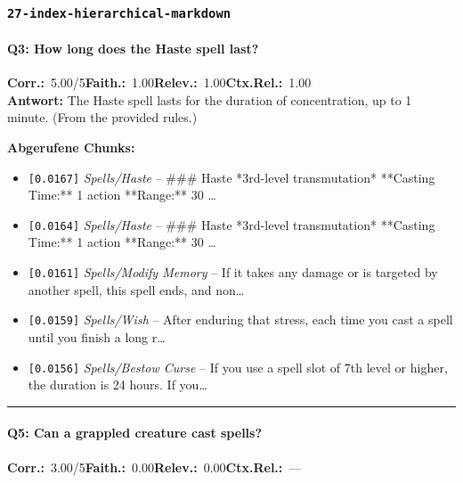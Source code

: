 \subsubsection*{\texttt{27-index-hierarchical-markdown}}
\label{app:samples:27_index_hierarchical_markdown}

\paragraph{Q3: How long does the Haste spell last?}
\noindent \textbf{Corr.:}~5.00/5\quad \textbf{Faith.:}~1.00\quad \textbf{Relev.:}~1.00\quad \textbf{Ctx.Rel.:}~1.00\\

\noindent\textbf{Antwort:} The Haste spell lasts for the duration of concentration, up to 1 minute. (From the provided rules.)

\noindent\textbf{Abgerufene Chunks:}
\begin{itemize}[noitemsep, topsep=2pt]
  \item[\textbf{\#1}] \texttt{[0.0167]} \textit{Spells/Haste} -- \#\#\# Haste  *3rd-level transmutation*  **Casting Time:** 1 action  **Range:** 30 \ldots
  \item[\textbf{\#2}] \texttt{[0.0164]} \textit{Spells/Haste} -- \#\#\# Haste  *3rd-level transmutation*  **Casting Time:** 1 action  **Range:** 30 \ldots
  \item[\textbf{\#3}] \texttt{[0.0161]} \textit{Spells/Modify Memory} -- If it takes any damage or is targeted by another spell, this spell ends, and non\ldots
  \item[\textbf{\#4}] \texttt{[0.0159]} \textit{Spells/Wish} -- After enduring that stress, each time you cast a spell until you finish a long r\ldots
  \item[\textbf{\#5}] \texttt{[0.0156]} \textit{Spells/Bestow Curse} -- If you use a spell slot of 7th level or higher, the duration is 24 hours. If you\ldots
\end{itemize}
\vspace{4pt}
\hrule
\vspace{6pt}

\paragraph{Q5: Can a grappled creature cast spells?}
\noindent \textbf{Corr.:}~3.00/5\quad \textbf{Faith.:}~0.00\quad \textbf{Relev.:}~0.00\quad \textbf{Ctx.Rel.:}~—\\

